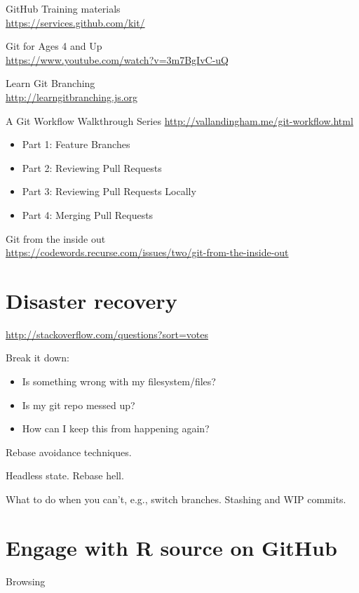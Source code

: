 \documentclass[
]{book}
\providecommand{\tightlist}{%
  \setlength{\itemsep}{0pt}\setlength{\parskip}{0pt}}
\begin{document}
GitHub Training materials\\
\url{https://services.github.com/kit/}

Git for Ages 4 and Up\\
\url{https://www.youtube.com/watch?v=3m7BgIvC-uQ}

Learn Git Branching\\
\url{http://learngitbranching.js.org}

A Git Workflow Walkthrough Series
\url{http://vallandingham.me/git-workflow.html}

\begin{itemize}
\tightlist
\item
  Part 1: Feature Branches
\item
  Part 2: Reviewing Pull Requests
\item
  Part 3: Reviewing Pull Requests Locally
\item
  Part 4: Merging Pull Requests
\end{itemize}

Git from the inside out\\
\url{https://codewords.recurse.com/issues/two/git-from-the-inside-out}

\section{Disaster recovery}\label{disaster-recovery}

\url{http://stackoverflow.com/questions?sort=votes}

Break it down:

\begin{itemize}
\tightlist
\item
  Is something wrong with my filesystem/files?
\item
  Is my git repo messed up?
\item
  How can I keep this from happening again?
\end{itemize}

Rebase avoidance techniques.

Headless state. Rebase hell.

What to do when you can't, e.g., switch branches. Stashing and WIP commits.

\section{Engage with R source on GitHub}\label{engage-with-r-source-on-github}

Browsing
\end{document}
